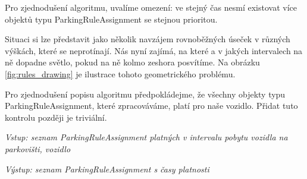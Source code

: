 \noindent
Pro zjednodušení algoritmu, uvalíme omezení: ve stejný čas nesmí existovat více objektů typu ParkingRuleAssignment
se stejnou prioritou.

Situaci si lze představit jako několik navzájem rovnoběžných úseček v různých výškách, které se neprotínají.
Nás nyní zajímá, na které a v jakých intervalech na ně dopadne světlo, pokud na ně kolmo zeshora posvítíme.
Na obrázku \ref{fig:rules_drawing} je ilustrace tohoto geometrického problému.

Pro zjednodušení popisu algoritmu předpokládejme, že všechny objekty typu ParkingRuleAssignment, které zpracováváme, platí pro naše vozidlo.
Přidat tuto kontrolu později je triviální.

\vspace{5mm}
\noindent
\textit{Vstup: seznam ParkingRuleAssignment platných v intervalu pobytu vozidla na parkovišti, vozidlo}

\noindent
\textit{Výstup: seznam ParkingRuleAssignment s časy platnosti}

